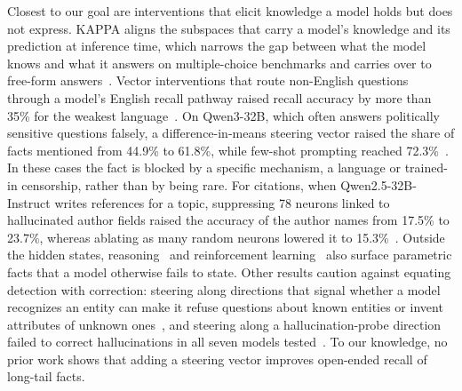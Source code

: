\documentclass[sigconf,nonacm]{acmart}
\begin{document}
Closest to our goal are interventions that elicit knowledge a model holds but does not express. KAPPA aligns the subspaces that carry a model's knowledge and its prediction at inference time, which narrows the gap between what the model knows and what it answers on multiple-choice benchmarks and carries over to free-form answers~\cite{park2026kappa}. Vector interventions that route non-English questions through a model's English recall pathway raised recall accuracy by more than 35\% for the weakest language~\cite{lu2025pathsnottaken}. On Qwen3-32B, which often answers politically sensitive questions falsely, a difference-in-means steering vector raised the share of facts mentioned from 44.9\% to 61.8\%, while few-shot prompting reached 72.3\%~\cite{casademunt2026censored}. In these cases the fact is blocked by a specific mechanism, a language or trained-in censorship, rather than by being rare. For citations, when Qwen2.5-32B-Instruct writes references for a topic, suppressing 78 neurons linked to hallucinated author fields raised the accuracy of the author names from 17.5\% to 23.7\%, whereas ablating as many random neurons lowered it to 15.3\%~\cite{chen2026fakecitations}. Outside the hidden states, reasoning~\cite{gekhman2026thinking} and reinforcement learning~\cite{yang2026rl} also surface parametric facts that a model otherwise fails to state. Other results caution against equating detection with correction: steering along directions that signal whether a model recognizes an entity can make it refuse questions about known entities or invent attributes of unknown ones~\cite{ferrando2025entity}, and steering along a hallucination-probe direction failed to correct hallucinations in all seven models tested~\cite{roy2026detection}. To our knowledge, no prior work shows that adding a steering vector improves open-ended recall of long-tail facts.
\end{document}
